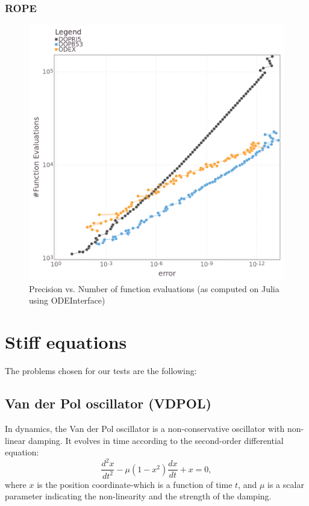\documentclass[notitlepage,12pt]{article}
\begin{document}
\subsubsection{ROPE}
\label{sub:rope}

\begin{figure}[H]
\centering
\includegraphics[scale=0.4]{../ImagesAndPDFs/Plots/RopePrecisionTest.png}
\caption{Precision vs. Number of function evaluations (as computed on Julia using ODEInterface)}
\label{fig:ropeJulia}
\end{figure}

\newpage

\section{Stiff equations}
The problems chosen for our tests are the following:
\label{sec:stiff}

\subsection{Van der Pol oscillator (VDPOL)}
\label{sub:vdpol}
In dynamics, the Van der Pol oscillator is a non-conservative oscillator with non-linear damping. It evolves in time according to the second-order differential equation:
\begin{equation}
\label{vdpolEq}
\frac{d^2x}{dt^2} -\mu \left(1-x^2 \right)\frac{dx}{dt}+x=0,
\end{equation}
where $x$ is the position coordinate-which is a function of time $t$, and $\mu$ is a scalar parameter indicating the non-linearity and the strength of the damping.
\end{document}
